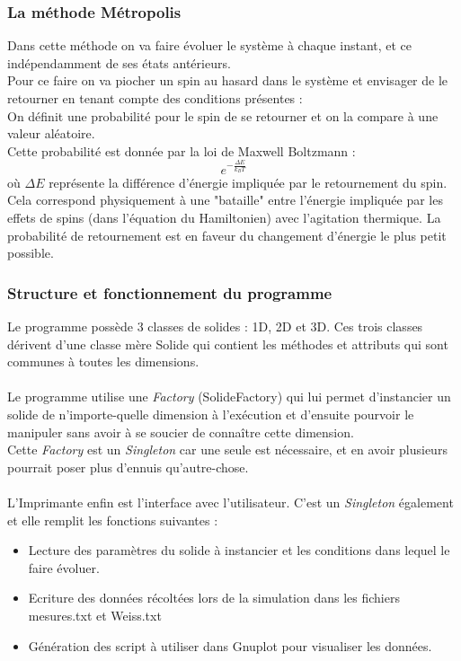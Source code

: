 \subsubsection{La méthode Métropolis}
Dans cette méthode on va faire évoluer le système à chaque instant, et ce indépendamment de ses états antérieurs.\\
Pour ce faire on va piocher un spin au hasard dans le système et envisager de le retourner en tenant compte des conditions présentes :\\
On définit une probabilité pour le spin de se retourner et on la compare à une valeur aléatoire.\\
Cette probabilité est donnée par la loi de Maxwell Boltzmann :\\
\begin{equation}
e^{- \frac{\Delta E}{k_B T}}
\end{equation}
où $\Delta E$ représente la différence d'énergie impliquée par le retournement du spin.\\
Cela correspond physiquement à une "bataille" entre l'énergie impliquée par les effets de spins (dans l'équation du Hamiltonien) avec l'agitation thermique. La probabilité de retournement est en faveur du changement d'énergie le plus petit possible.\\


\subsubsection{Structure et fonctionnement du programme}


Le programme possède 3 classes de solides : 1D, 2D et 3D. Ces trois classes dérivent d'une classe mère Solide qui contient les méthodes et attributs qui sont communes à toutes les dimensions.\\
\\
Le programme utilise une \emph{Factory} (SolideFactory) qui lui permet d'instancier un solide de n'importe-quelle dimension à l’exécution et d'ensuite pourvoir le manipuler sans avoir à se soucier de connaître cette dimension.\\
Cette \emph{Factory} est un \emph{Singleton} car une seule est nécessaire, et en avoir plusieurs pourrait poser plus d'ennuis qu'autre-chose.\\
\\
L'Imprimante enfin est l'interface avec l'utilisateur. C'est un \emph{Singleton} également et elle remplit les fonctions suivantes :\\
\begin{itemize}
\item Lecture des paramètres du solide à instancier et les conditions dans lequel le faire évoluer.
\item Ecriture des données récoltées lors de la simulation dans les fichiers mesures.txt et Weiss.txt
\item Génération des script à utiliser dans Gnuplot pour visualiser les données.
\end{itemize}
\vspace{\parskip} %

